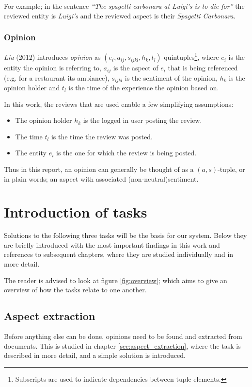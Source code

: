 \documentclass[a4paper,11pt]{kth-mag}
\begin{document}
For example; in the sentence \emph{``The spagetti carbonara at Luigi's is to die for''} the reviewed entity is \emph{Luigi's} and the reviewed aspect is their \emph{Spagetti Carbonara}.


\subsubsection{Opinion}
\emph{Liu} (2012) introduces \emph{opinion} as $(e_i,a_{ij},s_{ijkl},h_k,t_l)$-quintuples\footnote{Subscripts are
  used to indicate dependencies between tuple elements.},
where $e_i$ is the entity the opinion is referring to,
$a_{ij}$ is the aspect of $e_i$ that is being referenced (e.g. for a restaurant its ambiance),
$s_{ijkl}$ is the sentiment of the opinion,
$h_k$ is the opinion holder and
$t_l$ is the time of the experience the opinion based on\cite[Chapter~2.1]{liu2012sentiment}.

In this work, the reviews that are used enable a few simplifying assumptions:
\begin{itemize}
\item The opinion holder $h_k$ is the logged in user posting the review.
\item The time $t_l$ is the time the review was posted.
\item The entity $e_i$ is the one for which the review is being posted.
\end{itemize}

Thus in this report, an opinion can generally be thought of as a $(a,s)$-tuple, or in plain words; an aspect with associated (non-neutral)sentiment.


\section{Introduction of tasks}
Solutions to the following three tasks will be the basis for our system.
Below they are briefly introduced with the most important findings in this work and references
to subsequent chapters, where they are studied individually and in more detail.

The reader is advised to look at figure \ref{fig:overview}; which aims to
give an overview of how the tasks relate to one another.

\subsection{Aspect extraction}
Before anything else can be done, opinions need to be found and extracted from documents.
This is studied in chapter \ref{sec:aspect_extraction}, where the task is described in more detail,
and a simple solution is introduced.
\end{document}
